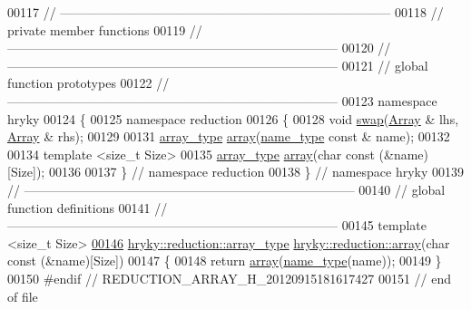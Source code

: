 \begin{DoxyCode}
00117 \textcolor{comment}{//
      ------------------------------------------------------------------------------}
00118 \textcolor{comment}{// private member functions}
00119 \textcolor{comment}{//
      ------------------------------------------------------------------------------}
00120 \textcolor{comment}{//
      ------------------------------------------------------------------------------}
00121 \textcolor{comment}{// global function prototypes}
00122 \textcolor{comment}{//
      ------------------------------------------------------------------------------}
00123 \textcolor{keyword}{namespace }hryky
00124 \{
00125 \textcolor{keyword}{namespace }reduction
00126 \{
00128     \textcolor{keywordtype}{void} \hyperlink{namespacehryky_1_1reduction_a493c83efdf5f9e9c49ba77e1b65325a1}{swap}(\hyperlink{classhryky_1_1reduction_1_1_array}{Array} & lhs, \hyperlink{classhryky_1_1reduction_1_1_array}{Array} & rhs);
00129 
00131     \hyperlink{classhryky_1_1_intrusive_ptr}{array_type} \hyperlink{namespacehryky_1_1reduction_a9d45a4dc1ea9a6668ebd192f296f788c}{array}(\hyperlink{classhryky_1_1reduction_1_1_string}{name_type} \textcolor{keyword}{const} & name);
00132 
00134     \textcolor{keyword}{template} <\textcolor{keywordtype}{size\_t} Size>
00135     \hyperlink{classhryky_1_1_intrusive_ptr}{array_type} \hyperlink{namespacehryky_1_1reduction_a9d45a4dc1ea9a6668ebd192f296f788c}{array}(\textcolor{keywordtype}{char} \textcolor{keyword}{const} (&name)[Size]);
00136 
00137 \} \textcolor{comment}{// namespace reduction}
00138 \} \textcolor{comment}{// namespace hryky}
00139 \textcolor{comment}{//
      ------------------------------------------------------------------------------}
00140 \textcolor{comment}{// global function definitions}
00141 \textcolor{comment}{//
      ------------------------------------------------------------------------------}
00145 \textcolor{comment}{}\textcolor{keyword}{template} <\textcolor{keywordtype}{size\_t} Size>
\hypertarget{reduction__array_8h_source_l00146}{}\hyperlink{namespacehryky_1_1reduction_a622f9264b5b3991f5895b27aeaac27fa}{00146} \hyperlink{classhryky_1_1_intrusive_ptr}{hryky::reduction::array_type} \hyperlink{namespacehryky_1_1reduction_a9d45a4dc1ea9a6668ebd192f296f788c}{hryky::reduction::array}(\textcolor{keywordtype}{char} \textcolor{keyword}{const} (&name)[Size])
00147 \{
00148     \textcolor{keywordflow}{return} \hyperlink{namespacehryky_1_1reduction_a9d45a4dc1ea9a6668ebd192f296f788c}{array}(\hyperlink{namespacehryky_1_1reduction_ac686c30a4c8d196bbd0f05629a6b921f}{name_type}(name));
00149 \}
00150 \textcolor{preprocessor}{#endif // REDUCTION\_ARRAY\_H\_20120915181617427}
00151 \textcolor{preprocessor}{}\textcolor{comment}{// end of file}
\end{DoxyCode}
